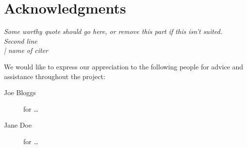 
\bigskip

\begingroup
\let\clearpage\relax
\let\cleardoublepage\relax
\let\cleardoublepage\relax
\chapter*{Acknowledgments}
\begin{flushright}{\slshape
    Some worthy quote should go here, or remove this part if this isn't
    suited.\\
    Second line \\ \medskip
    | name of citer}
\end{flushright}
\bigskip

We would like to express our appreciation to the following people for
advice and assistance throughout the project:

\begin{description}
\item[Joe Bloggs] for \ldots
\item[Jane Doe] for \ldots
\end{description}
\endgroup
